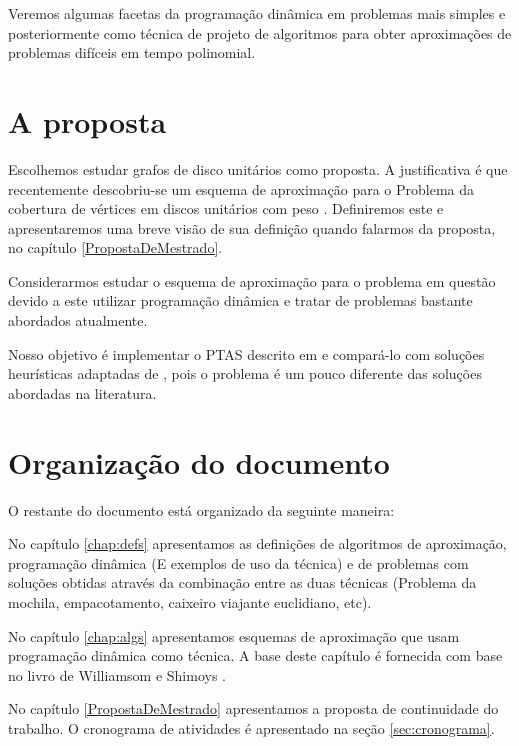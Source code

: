 Veremos algumas facetas da programação dinâmica em problemas mais simples e posteriormente como técnica de projeto de algoritmos para obter aproximações de problemas difíceis em tempo polinomial.

\section{A proposta}

Escolhemos estudar grafos de disco unitários como proposta. A justificativa é que recentemente descobriu-se um esquema de aproximação para o Problema da cobertura de vértices em discos unitários com peso \cite{li}. Definiremos este e apresentaremos uma breve visão de sua definição quando falarmos da proposta, no capítulo \ref{PropostaDeMestrado}.

Considerarmos estudar o esquema de aproximação para o problema em questão devido a este utilizar programação dinâmica e tratar de problemas bastante abordados atualmente.

Nosso objetivo é implementar o PTAS descrito em \cite{li} e compará-lo com soluções heurísticas adaptadas de \cite{marathe1995simple}, pois o problema é um pouco diferente das soluções abordadas na literatura.

\section{Organização do documento}

O restante do documento está organizado da seguinte maneira:

No capítulo \ref{chap:defs} apresentamos as definições de algoritmos de aproximação, programação dinâmica (E exemplos de uso da técnica) e de problemas com soluções obtidas através da combinação entre as duas técnicas (Problema da mochila, empacotamento, caixeiro viajante euclidiano, etc).

No capítulo \ref{chap:algs} apresentamos esquemas de aproximação que usam programação dinâmica como técnica. A base deste capítulo é fornecida com base no livro de Williamsom e Shimoys \cite{Williamson}.

No capítulo \ref{PropostaDeMestrado} apresentamos a proposta de continuidade do trabalho. O cronograma de atividades é apresentado na seção \ref{sec:cronograma}.
